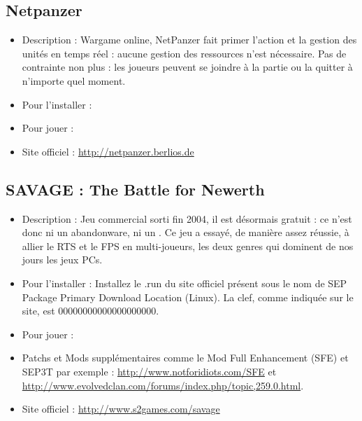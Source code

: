\subsection{Netpanzer}
\begin{itemize}
\begingroup
{}
\item Description : Wargame online, NetPanzer fait primer l'action et la gestion des unités en temps réel : aucune gestion des ressources n'est nécessaire. Pas de contrainte non plus : les joueurs peuvent se joindre à la partie ou la quitter à n'importe quel moment.{\par}
\item Pour l'installer : 
\item Pour jouer : 
\item Site officiel : \url{http://netpanzer.berlios.de}{\par}
\endgroup
\end{itemize}
\subsection{SAVAGE : The Battle for Newerth}
\begin{itemize}
\begingroup
{}
\item Description : Jeu commercial sorti fin 2004, il est désormais gratuit : ce n'est donc ni un abandonware, ni un . Ce jeu a essayé, de manière assez réussie, à allier le RTS et le FPS en multi-joueurs, les deux genres qui dominent de nos jours les jeux PCs.{\par}
\endgroup
\item Pour l'installer : Installez le .run du site officiel présent sous le nom de SEP Package Primary Download Location (Linux). La clef, comme indiquée sur le site, est 00000000000000000000.{\par}
\item Pour jouer : 
\item Patchs et Mods supplémentaires comme le Mod Full Enhancement (SFE) et SEP3T par exemple : \url{http://www.notforidiots.com/SFE} et \url{http://www.evolvedclan.com/forums/index.php/topic,259.0.html}.{\par}
\item Site officiel : \url{http://www.s2games.com/savage}{\par}
\end{itemize}
